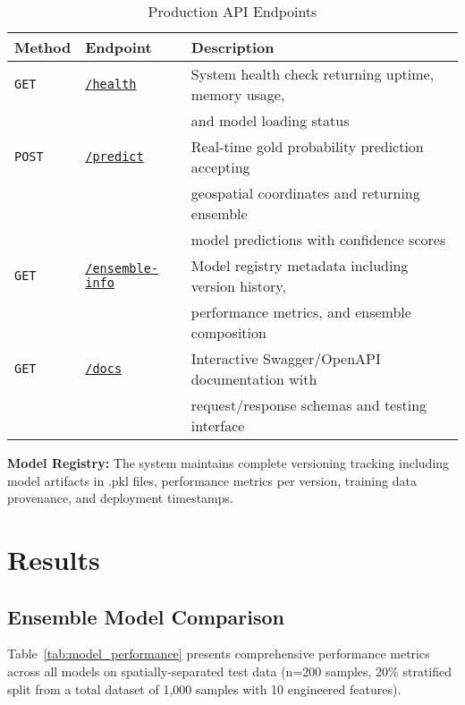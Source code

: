 \documentclass[12pt,a4paper]{article}
\begin{document}
\begin{table}[ht]
\centering
\caption{Production API Endpoints}
\label{tab:api_endpoints}
\begin{tabular}{@{}lll@{}}
\toprule
\textbf{Method} & \textbf{Endpoint} & \textbf{Description} \\
\midrule
\texttt{GET} & \href{https://geoaupredict.onrender.com/health}{\texttt{/health}} & System health check returning uptime, memory usage, \\
& & and model loading status \\

\texttt{POST} & \href{https://geoaupredict.onrender.com/predict}{\texttt{/predict}} & Real-time gold probability prediction accepting \\
& & geospatial coordinates and returning ensemble \\
& & model predictions with confidence scores \\

\texttt{GET} & \href{https://geoaupredict.onrender.com/ensemble-info}{\texttt{/ensemble-info}} & Model registry metadata including version history, \\
& & performance metrics, and ensemble composition \\

\texttt{GET} & \href{https://geoaupredict.onrender.com/docs}{\texttt{/docs}} & Interactive Swagger/OpenAPI documentation with \\
& & request/response schemas and testing interface \\
\bottomrule
\end{tabular}
\end{table}

\textbf{Model Registry:} The system maintains complete versioning tracking including model artifacts in .pkl files, performance metrics per version, training data provenance, and deployment timestamps.

\section{Results}

\subsection{Ensemble Model Comparison}

Table~\ref{tab:model_performance} presents comprehensive performance metrics across all models on spatially-separated test data (n=200 samples, 20\% stratified split from a total dataset of 1,000 samples with 10 engineered features).
\end{document}
